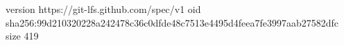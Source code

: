 version https://git-lfs.github.com/spec/v1
oid sha256:99d210320228a242478c36c0dfde48c7513e4495d4feea7fe3997aab27582dfc
size 419
